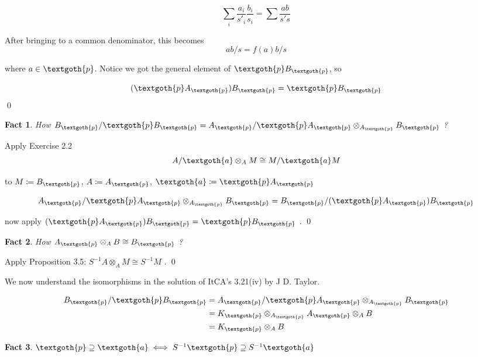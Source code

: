 \documentclass{article}
\newtheorem{theorem}{Fact}[section]
\begin{document}
\[
 \sum_i \frac{a_i}{s'_i} \frac{b_i}{s_i} = \sum \frac{ab}{s's}
\]

\noindent
After bringing to a common denominator, this becomes
\[
 ab/s = f(a)b/s
\]

\noindent
where $a \in \textgoth{p}$. Notice we got the general element of $\textgoth{p} B_\textgoth{p}$, so

\[
 (\textgoth{p} A_\textgoth{p}) B_\textgoth{p} = \textgoth{p} B_\textgoth{p}
\]
\qed

\bigskip
\begin{theorem}
How $B_\textgoth{p}/\textgoth{p} B_\textgoth{p} = A_\textgoth{p}/\textgoth{p} A_\textgoth{p} \otimes_{A_\textgoth{p}} B_\textgoth{p}$ ?
\end{theorem}

Apply Exercise 2.2
\[
 A/\textgoth{a} \otimes_A M \cong M / \textgoth{a} M 
\]

\noindent
to $M \coloneqq B_\textgoth{p}$, $A \coloneqq A_\textgoth{p}$, $\textgoth{a} \coloneqq \textgoth{p} A_\textgoth{p}$

\[
 A_\textgoth{p}/\textgoth{p} A_\textgoth{p} \otimes_{A_\textgoth{p}} B_\textgoth{p} = B_\textgoth{p}/(\textgoth{p} A_\textgoth{p}) B_\textgoth{p}
\]

\noindent
now apply $(\textgoth{p} A_\textgoth{p}) B_\textgoth{p} = \textgoth{p} B_\textgoth{p}$ . 
\qed

\vspace{1.5em}
\begin{theorem}
How $A_\textgoth{p} \otimes_A B \cong B_\textgoth{p}$ ?
\end{theorem}

Apply Proposition 3.5: $S^{-1}A \otimes_A M \cong S^{-1}M$ . 
\qed

\vspace{1em}
We now understand the isomorphisms in the solution of ItCA's 3.21(iv) by J D. Taylor.

\begin{equation*}
\begin{split}
 B_\textgoth{p}/\textgoth{p}B_\textgoth{p} 
 & = A_\textgoth{p}/\textgoth{p}A_\textgoth{p} 
 \otimes_{A_\textgoth{p}} B_\textgoth{p} \\ 
 & = K_\textgoth{p} \otimes_{A_\textgoth{p}} A_\textgoth{p} \otimes_A B \\
 & = K_\textgoth{p} \otimes_A B
\end{split}
\end{equation*}

\bigskip
\begin{theorem}
$\textgoth{p} \supseteq \textgoth{a} \iff S^{-1}\textgoth{p} \supseteq S^{-1}\textgoth{a}$
\end{theorem}
\end{document}
